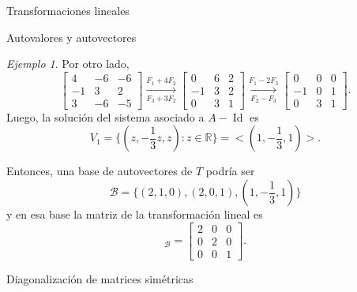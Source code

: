 \documentclass[a4paper,12pt,twoside,spanish,reqno]{amsbook}
\numberwithin{equation}{section}
\theoremstyle{definition}
\theoremstyle{remark}
\newtheorem*{ejemplo*}{Ejemplo}
\newcommand{\Id}{\operatorname{Id}}
\newcommand{\R}{\mathbb R}
\begin{document}
\begin{chapter}{Transformaciones lineales}
\begin{section}{Autovalores y autovectores}
\begin{ejemplo*}
            Por otro lado, 
            \begin{equation*}
            \begin{bmatrix}4 &-6 &-6\\ -1& 3& 2\\3 &-6& -5 	\end{bmatrix}
            \underset{F_3+3F_2}{\stackrel{F_1+4 F_2}{\longrightarrow}} 
            \begin{bmatrix}0 &6 &2\\ -1& 3& 2\\0 &3& 1 	\end{bmatrix}
            \underset{F_2-F_3}{\stackrel{F_1-2 F_3}{\longrightarrow}}
            \begin{bmatrix}0 &0 &0\\ -1& 0& 1\\0 &3& 1 	\end{bmatrix}.
            \end{equation*}
            Luego,  la solución del sistema asociado a  $A-\Id$ es 
            $$
            V_1 = \{(z,-\frac13z,z): z \in \R\} = <(1,-\frac13,1)>.
            $$
            
            Entonces, una base de autovectores de $T$ podría ser
            $$
            \mathcal{B} = \{(2,1,0),(2,0,1),(1,-\frac13,1) \}
            $$
            y en esa base la matriz de la transformación lineal es
            \begin{equation*}
            [T]_{\mathcal{B}} = \begin{bmatrix}2 &0 &0\\ 0& 2& 0\\0 &0& 1 	\end{bmatrix}.
            \end{equation*}
        \end{ejemplo*}
    
        
        \end{section}
    
    
        
    

\begin{section}{Diagonalización de matrices simétricas}\label{seccion-diagonalizacion-de-simetricas}
    

    
    

\end{section}
\end{chapter}
\end{document}
